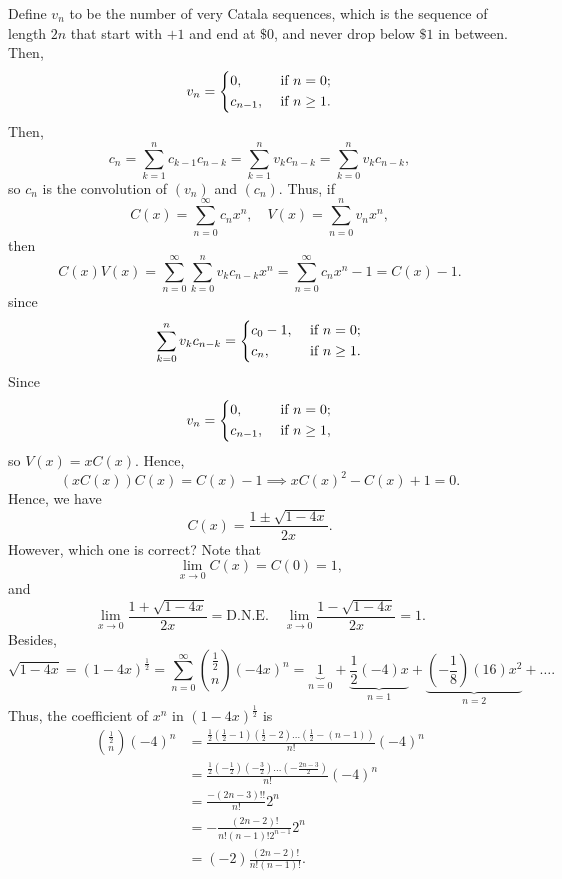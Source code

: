 Define \(v_n\) to be the number of very Catala sequences, which is the sequence of length \(2n\) that start with \(+1\) and end at \(\$0\), and never drop below \(\$ 1\) in between. Then, 
\[
    v_n = \begin{dcases}
        0, &\text{ if } n=0 ;\\
        c_{n-1}, &\text{ if } n \ge 1 .
    \end{dcases}
\]     
Then, 
\[
    c_n = \sum_{k=1}^n c_{k-1} c_{n-k} = \sum_{k=1}^n v_k c_{n-k} = \sum_{k=0}^n v_k c_{n-k}, 
\] so \(c_n\) is the convolution of \((v_n)\) and \((c_n)\).   
Thus, if 
\[
    C(x) = \sum_{n=0}^{\infty} c_n x^n, \quad V(x) = \sum_{n=0}^n v_n x^n,  
\]
then 
\[
    C(x) V(x) = \sum_{n=0}^{\infty} \sum_{k=0}^{n} v_k c_{n-k} x^n = \sum_{n=0}^{\infty} c_n x^n - 1 = C(x) - 1.   
\] since 
\[
    \sum_{k=0}^n v_k c_{n-k} = \begin{dcases}
        c_0 - 1, &\text{ if } n=0  ;\\
        c_n, &\text{ if }  n \ge 1.
    \end{dcases} 
\]
Since 
\[
    v_n = \begin{dcases}
        0, &\text{ if } n=0 ;\\
        c_{n-1}, &\text{ if } n \ge 1,
    \end{dcases}
\]
so \(V(x) = x C(x)\). 
Hence, 
\[
    \left( x C(x) \right) C(x) = C(x) - 1 \implies x C(x)^2 - C(x) + 1 = 0. 
\]
Hence, we have 
\[
    C(x) = \frac{1 \pm \sqrt{1 - 4x} }{2x}.
\]
However, which one is correct? Note that 
\[
    \lim_{x \to 0} C(x) = C(0) = 1, 
\]
and 
\[
    \lim_{x \to 0} \frac{1 + \sqrt{1 - 4x} }{2x} = \mathrm{D.N.E.}  \quad \lim_{x \to 0} \frac{1 - \sqrt{1 - 4x} }{2x} = 1.  
\]
Besides, 
\[
    \sqrt{1 - 4x} = (1 - 4x)^{\frac{1}{2}} = \sum_{n=0}^{\infty} \binom{\frac{1}{2}}{n}(-4x)^n = \underbrace{1}_{n=0} + \underbrace{\frac{1}{2}(-4)x}_{n=1} + \underbrace{\left( -\frac{1}{8} \right)(16)x^2 }_{n=2} + \dots.  
\]
Thus, the coefficient of \(x^n\) in \((1 - 4x)^{\frac{1}{2}}\) is 
\begin{align*}
    \binom{\frac{1}{2}}{n}(-4)^n &= \frac{\frac{1}{2} \left( \frac{1}{2} - 1 \right)\left( \frac{1}{2} - 2 \right) \dots \left( \frac{1}{2} - (n - 1) \right)   }{n!}(-4)^n \\
    &= \frac{\frac{1}{2} \left( -\frac{1}{2} \right) \left( -\frac{3}{2} \right) \dots \left( - \frac{2n - 3}{2} \right)   }{n!}(-4)^n \\
    &= \frac{-(2n - 3)!!}{n!} 2^n \\
    &= - \frac{(2n - 2)!}{n!(n-1)!2^{n-1}}2^n \\
    &= (-2) \frac{(2n - 2)!}{n! (n-1)!}.
\end{align*} 

